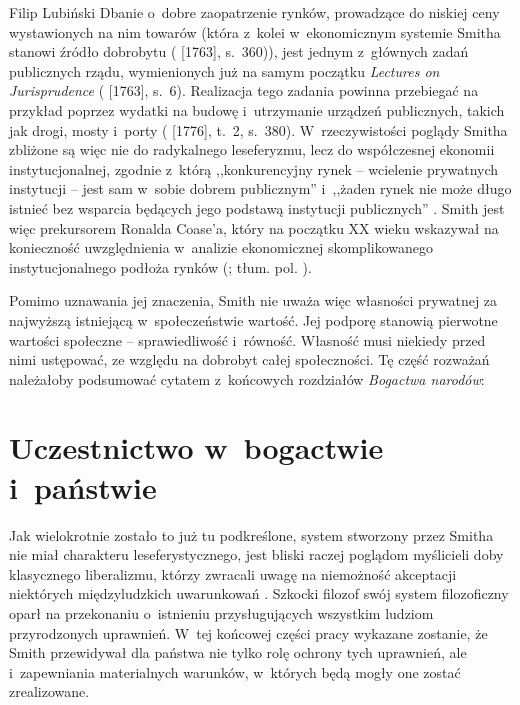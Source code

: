 \begin{artplenv}{Filip Lubiński}
Dbanie o~dobre zaopatrzenie rynków, prowadzące do niskiej ceny wystawionych na nim towarów
(która z~kolei w~ekonomicznym systemie Smitha stanowi źródło dobrobytu
(\cite{smith_lectures_1982} [1763], s.~360)),
jest
jednym z~głównych zadań publicznych rządu, wymienionych już na samym początku \textit{Lectures on Jurisprudence}
(\cite{smith_lectures_1982} [1763], s.~6).
Realizacja tego zadania powinna przebiegać na przykład poprzez
wydatki na budowę i~utrzymanie urządzeń publicznych, takich jak drogi, mosty i~porty
(\cite{smith_badania_2007} [1776], t.~2, s.~380).
W~rzeczywistości poglądy Smitha zbliżone są więc nie do radykalnego leseferyzmu, lecz do
współczesnej ekonomii instytucjonalnej, zgodnie z~którą ,,konkurencyjny rynek -- wcielenie prywatnych instytucji -- jest
sam w~sobie dobrem publicznym'' i~,,żaden rynek nie może długo istnieć bez wsparcia będących jego podstawą instytucji
publicznych''
\parencite[s.~20]{ostrom_dysponowanie_2013}.
Smith jest więc prekursorem Ronalda Coase'a, który na
początku XX wieku wskazywał na konieczność uwzględnienia w~analizie ekonomicznej skomplikowanego instytucjonalnego
podłoża rynków
(\cite[s.~8]{coase_firm_1990}; tłum. pol. \cite*{coase_firma_2013}).

Pomimo uznawania jej znaczenia, Smith nie uważa więc własności prywatnej za najwyższą istniejącą w~społeczeństwie
wartość. Jej podporę stanowią pierwotne wartości społeczne -- sprawiedliwość i~równość. Własność musi niekiedy przed
nimi ustępować, ze względu na dobrobyt całej społeczności. Tę część rozważań należałoby podsumować cytatem z~końcowych
rozdziałów \textit{Bogactwa narodów}:

\section{Uczestnictwo w~bogactwie i~państwie}
Jak wielokrotnie zostało to już tu podkreślone, system stworzony przez Smitha nie miał charakteru leseferystycznego,
jest bliski raczej poglądom myślicieli doby klasycznego liberalizmu, którzy zwracali uwagę na niemożność akceptacji
niektórych międzyludzkich uwarunkowań
\parencite[s.~215]{rawls_wyklady_2010}.
Szkocki filozof swój system
filozoficzny oparł na przekonaniu o~istnieniu przysługujących wszystkim ludziom przyrodzonych uprawnień. W~tej końcowej
części pracy wykazane zostanie, że Smith przewidywał dla państwa nie tylko rolę ochrony tych uprawnień,
ale i~zapewniania materialnych warunków, w~których będą mogły one zostać zrealizowane.


\end{artplenv}
